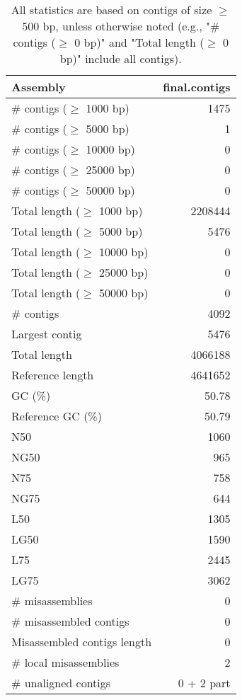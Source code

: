 \documentclass[12pt,a4paper]{article}
\begin{document}
\begin{table}[ht]
\begin{center}
\caption{All statistics are based on contigs of size $\geq$ 500 bp, unless otherwise noted (e.g., "\# contigs ($\geq$ 0 bp)" and "Total length ($\geq$ 0 bp)" include all contigs).}
\begin{tabular}{|l*{1}{|r}|}
\hline
Assembly & final.contigs \\ \hline
\# contigs ($\geq$ 1000 bp) & 1475 \\ \hline
\# contigs ($\geq$ 5000 bp) & 1 \\ \hline
\# contigs ($\geq$ 10000 bp) & 0 \\ \hline
\# contigs ($\geq$ 25000 bp) & 0 \\ \hline
\# contigs ($\geq$ 50000 bp) & 0 \\ \hline
Total length ($\geq$ 1000 bp) & 2208444 \\ \hline
Total length ($\geq$ 5000 bp) & 5476 \\ \hline
Total length ($\geq$ 10000 bp) & 0 \\ \hline
Total length ($\geq$ 25000 bp) & 0 \\ \hline
Total length ($\geq$ 50000 bp) & 0 \\ \hline
\# contigs & 4092 \\ \hline
Largest contig & 5476 \\ \hline
Total length & 4066188 \\ \hline
Reference length & 4641652 \\ \hline
GC (\%) & 50.78 \\ \hline
Reference GC (\%) & 50.79 \\ \hline
N50 & 1060 \\ \hline
NG50 & 965 \\ \hline
N75 & 758 \\ \hline
NG75 & 644 \\ \hline
L50 & 1305 \\ \hline
LG50 & 1590 \\ \hline
L75 & 2445 \\ \hline
LG75 & 3062 \\ \hline
\# misassemblies & 0 \\ \hline
\# misassembled contigs & 0 \\ \hline
Misassembled contigs length & 0 \\ \hline
\# local misassemblies & 2 \\ \hline
\# unaligned contigs & 0 + 2 part \\ \hline

\end{tabular}
\end{center}
\end{table}
\end{document}
